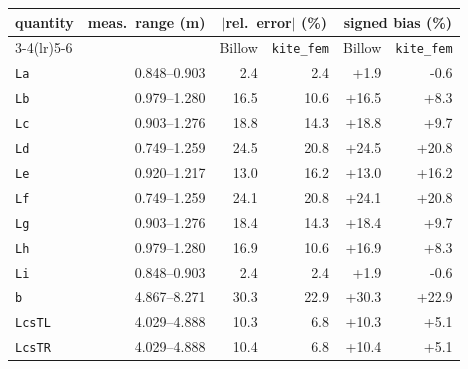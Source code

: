 \begin{tabular}{lrrrrr}
\toprule
quantity & meas.\ range (m) & \multicolumn{2}{c}{$|$rel.\ error$|$ (\%)} & \multicolumn{2}{c}{signed bias (\%)} \\
\cmidrule(lr){3-4}\cmidrule(lr){5-6}
 & & Billow & \texttt{kite\_fem} & Billow & \texttt{kite\_fem} \\
\midrule
\texttt{La} & 0.848--0.903 & 2.4 & 2.4 & +1.9 & -0.6 \\
\texttt{Lb} & 0.979--1.280 & 16.5 & 10.6 & +16.5 & +8.3 \\
\texttt{Lc} & 0.903--1.276 & 18.8 & 14.3 & +18.8 & +9.7 \\
\texttt{Ld} & 0.749--1.259 & 24.5 & 20.8 & +24.5 & +20.8 \\
\texttt{Le} & 0.920--1.217 & 13.0 & 16.2 & +13.0 & +16.2 \\
\texttt{Lf} & 0.749--1.259 & 24.1 & 20.8 & +24.1 & +20.8 \\
\texttt{Lg} & 0.903--1.276 & 18.4 & 14.3 & +18.4 & +9.7 \\
\texttt{Lh} & 0.979--1.280 & 16.9 & 10.6 & +16.9 & +8.3 \\
\texttt{Li} & 0.848--0.903 & 2.4 & 2.4 & +1.9 & -0.6 \\
\texttt{b} & 4.867--8.271 & 30.3 & 22.9 & +30.3 & +22.9 \\
\texttt{LcsTL} & 4.029--4.888 & 10.3 & 6.8 & +10.3 & +5.1 \\
\texttt{LcsTR} & 4.029--4.888 & 10.4 & 6.8 & +10.4 & +5.1 \\
\bottomrule
\end{tabular}